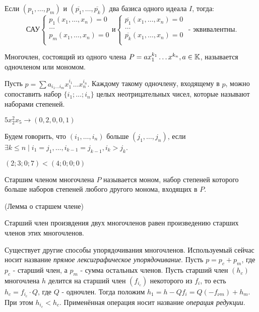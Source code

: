 \utv Если $(p_1,\ldots,p_m)$ и $(\overline{p_1},\ldots,\overline{p_k})$ два базиса одного идеала $I$, тогда:
\begin{equation*}
	\text{САУ}
	\begin{cases}
	   	p_1(x_1,\ldots,x_n) = 0\\
		\ldots\\
	   	p_m(x_1,\ldots,x_n) = 0\\
	\end{cases}
\text{и}
	\begin{cases}
	   	\overline{p_1}(x_1,\ldots,x_n) = 0\\
		\ldots\\
	   	\overline{p_k}(x_1,\ldots,x_n) = 0\\
	\end{cases}
\text{ - эквивалентны.}
\end{equation*}

\opr Многочлен, состоящий из одного члена $P = ax_1^{k_1}\ldots x^{k_n}, a \in \mathbb{K}$, называется одночленом или мономом.

Пусть $p = \sum a_{i_1 \ldots i_m}x_1^{i_1}\ldots x_n^{i_n}.$ Каждому такому одночлену, входящему в $p$, можно сопоставить набор $\{i_1;\ldots;i_n\}$  целых неотрицательных чисел, которые называют наборами степеней.

\example $5x_2^2x_5 \rightarrow (0,2,0,0,1)$

\opr Будем говорить, что $(i_1,\ldots,i_n)$ больше $(j_1,\ldots,j_n)$, если $\exists k \le n \mid i_1 = j_1, \ldots, i_{k-1} = j_{k-1},i_k > j_k$.

\example $(2;3;0;7) < (4;0;0;0)$

\opr Старшим членом многочлена $P$ называется моном, набор степеней которого больше наборов степеней любого другого монома, входящих в $P$.

\lem (Лемма о старшем члене)

Старший член произвдения двух многочленов равен произведению старших членов этих многочленов.

\note Существует другие способы упорядочивания многочленов. Используемый сейчас носит название \emph{прямое лексиграфическое упорядочивание}. Пусть $p = p_c + p_m$, где $p_c$ - старший член, а  $p_m$ - сумма остальных членов. Пусть старший член $(h_c)$ многочлена $h$ делится на старший член $(f_{i_c})$ некоторого из $f_i$, то есть $h_c = f_{i_c} \cdot Q$, где $Q$ - одночлен. Тогда положим $h_1 = h - Qf_i = Q(-f_{\nu m}) + h_m$. При этом $h_{i_c} < h_c$. Применённая операция носит название \emph{операция редукции}.

